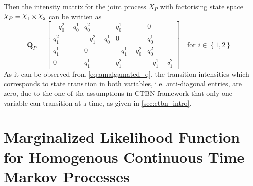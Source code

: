 Then the intensity matrix for the joint process $ X_P $ with factorising state space $ \rchi_P = \rchi_1 \times \rchi_2 $ can be written as
\begin{equation}
\textbf{Q}_P = 
\begin{bmatrix}
-q^{2}_{0}-q^{1}_{0} & q^{2}_{0} & q^{1}_{0} & 0 \\
q^{2}_{1} & -q^{2}_{1}-q^{1}_{0} & 0 & q^{1}_{0} \\
q^{1}_{1} & 0 & -q^{1}_{1}-q^{2}_{0} & q^{2}_{0} \\
0 & q^{1}_{1} & q^{2}_{1} & -q^{1}_{1}-q^{2}_{1}
\end{bmatrix} \quad \text{for } i \in \left\lbrace 1,2\right\rbrace 
\label{eq:amalgamated_q}
\end{equation}
As it can be observed from \autoref{eq:amalgamated_q}, the transition intensities which corresponds to state transition in both variables, i.e. anti-diagonal entries, are zero, due to the one of the assumptions in CTBN framework that only one variable can transition at a time, as given in \cref{sec:ctbn_intro}.
\chapter{Marginalized Likelihood Function for Homogenous Continuous Time Markov Processes}
\label{ap:marg_llh_ctmp}

